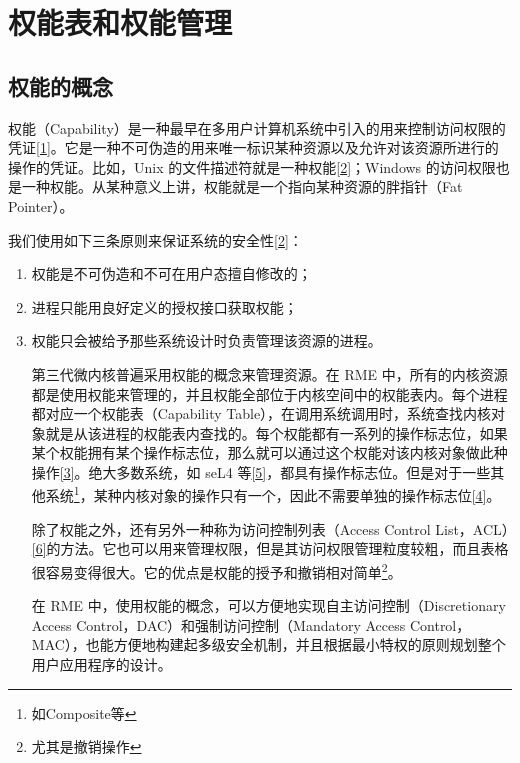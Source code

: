 \chapter{权能表和权能管理}\label{ch:capability-table-management}

\section{权能的概念}\label{sec:2-capability-concept}

权能（Capability）是一种最早在多用户计算机系统中引入的用来控制访问权限的凭证\hyperref[cite:2-1]{{[}1{]}}。它是一种不可伪造的用来唯一标识某种资源以及允许对该资源所进行的操作的凭证。比如，Unix 的文件描述符就是一种权能\hyperref[cite:2-2]{{[}2{]}}；Windows 的访问权限也是一种权能。从某种意义上讲，权能就是一个指向某种资源的胖指针（Fat
Pointer）。

我们使用如下三条原则来保证系统的安全性\hyperref[cite:2-2]{{[}2{]}}：

\begin{enumerate}
\def\labelenumi{\arabic{enumi}.}
\item
  权能是不可伪造和不可在用户态擅自修改的；
\item
  进程只能用良好定义的授权接口获取权能；
\item
  权能只会被给予那些系统设计时负责管理该资源的进程。

  第三代微内核普遍采用权能的概念来管理资源。在 RME 中，所有的内核资源都是使用权能来管理的，并且权能全部位于内核空间中的权能表内。每个进程都对应一个权能表（Capability
  Table），在调用系统调用时，系统查找内核对象就是从该进程的权能表内查找的。每个权能都有一系列的操作标志位，如果某个权能拥有某个操作标志位，那么就可以通过这个权能对该内核对象做此种操作\hyperref[cite:2-3]{{[}3{]}}。绝大多数系统，如 seL4 等\hyperref[cite:2-5]{{[}5{]}}，都具有操作标志位。但是对于一些其他系统\footnote{如Composite等}，某种内核对象的操作只有一个，因此不需要单独的操作标志位\hyperref[cite:2-4]{{[}4{]}}。

  除了权能之外，还有另外一种称为访问控制列表（Access Control List，ACL）\hyperref[cite:2-6]{{[}6{]}}的方法。它也可以用来管理权限，但是其访问权限管理粒度较粗，而且表格很容易变得很大。它的优点是权能的授予和撤销相对简单\footnote{尤其是撤销操作}。

  在 RME 中，使用权能的概念，可以方便地实现自主访问控制（Discretionary Access
  Control，DAC）和强制访问控制（Mandatory Access
  Control，MAC），也能方便地构建起多级安全机制，并且根据最小特权的原则规划整个用户应用程序的设计。
\end{enumerate}

